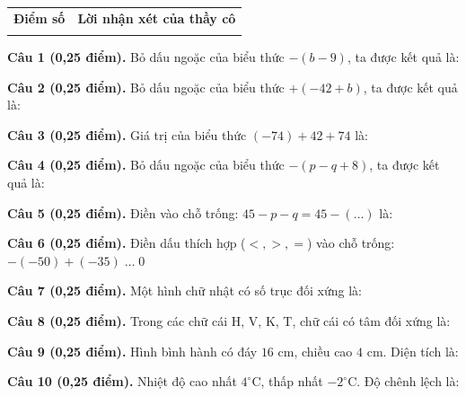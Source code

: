 \documentclass[12pt,a4paper]{article}
\begin{document}
\vspace{1.0mm}

\noindent
\begin{tabularx}{\linewidth}{|p{3.2cm}|X|}
\hline
\centering\textbf{Điểm số} & \centering\textbf{Lời nhận xét của thầy cô} \tabularnewline
\rule{0pt}{1.8cm} & \\
\hline
\end{tabularx}

\vspace{1.0mm}
\noindent\textbf{Câu 1 (0,25 điểm).} Bỏ dấu ngoặc của biểu thức $-(b - 9)$, ta được kết quả là: \par\vspace{0.25mm}
\noindent\textbf{Câu 2 (0,25 điểm).} Bỏ dấu ngoặc của biểu thức $+(-42 + b)$, ta được kết quả là: \par\vspace{0.25mm}
\noindent\textbf{Câu 3 (0,25 điểm).} Giá trị của biểu thức $(-74) + 42 + 74$ là: \par\vspace{0.25mm}
\noindent\textbf{Câu 4 (0,25 điểm).} Bỏ dấu ngoặc của biểu thức $-(p - q + 8)$, ta được kết quả là: \par\vspace{0.25mm}
\noindent\textbf{Câu 5 (0,25 điểm).} Điền vào chỗ trống: $45 - p - q = 45 - (\dots)$ là: \par\vspace{0.25mm}
\noindent\textbf{Câu 6 (0,25 điểm).} Điền dấu thích hợp ($<, >, =$) vào chỗ trống: $-(-50) + (-35) \; \dots \; 0$ \shortans{>}\par\vspace{0.25mm}
\noindent\textbf{Câu 7 (0,25 điểm).} Một hình chữ nhật có số trục đối xứng là: \par\vspace{0.25mm}
\noindent\textbf{Câu 8 (0,25 điểm).} Trong các chữ cái H, V, K, T, chữ cái có tâm đối xứng là: \par\vspace{0.25mm}
\noindent\textbf{Câu 9 (0,25 điểm).} Hình bình hành có đáy $16\text{ cm}$, chiều cao $4\text{ cm}$. Diện tích là: \par\vspace{0.25mm}
\noindent\textbf{Câu 10 (0,25 điểm).} Nhiệt độ cao nhất $4^\circ\text{C}$, thấp nhất $-2^\circ\text{C}$. Độ chênh lệch là: \par\vspace{0.25mm}
\end{document}
